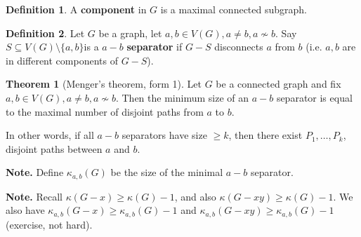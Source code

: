 \documentclass{article}
\theoremstyle{definition}
\newtheorem{theorem}{Theorem}[section]
\newtheorem{defn}{Definition}[section]
\begin{document}
\begin{defn}
    A \textbf{component} in $G$ is a maximal connected subgraph.
\end{defn}
\begin{defn}
    Let $G$ be a graph, let $a,b \in V(G), a\neq b, a \not\sim b$. Say $S \subseteq V(G) \setminus \{a,b\}$is a $a-b$ \textbf{separator} if $G-S$ disconnects $a$ from $b$ (i.e. $a,b$ are in different components of $G-S$).
\end{defn}
\begin{theorem}[Menger's theorem, form 1]
    Let $G$ be a connected graph and fix $a,b \in V(G), a\neq b, a \not\sim b$. Then the minimum size of an $a-b$ separator is equal to the maximal number of disjoint paths from $a$ to $b$.
    \vspace{1mm}
    
    In other words, if all $a-b$ separators have size $\ge k$, then there exist $P_1,\ldots,P_k$, disjoint paths between $a$ and $b$.
\end{theorem}


\textbf{Note.} Define $\kappa_{a,b}(G)$ be the size of the minimal $a-b$ separator.

\textbf{Note.} Recall $\kappa(G-x)\ge \kappa(G)-1$, and also $\kappa(G-xy)\ge \kappa(G)-1$. We also have $\kappa_{a,b}(G-x)\ge \kappa_{a,b}(G)-1$ and  $\kappa_{a,b}(G-xy)\ge \kappa_{a,b}(G)-1$ (exercise, not hard).
\end{document}
